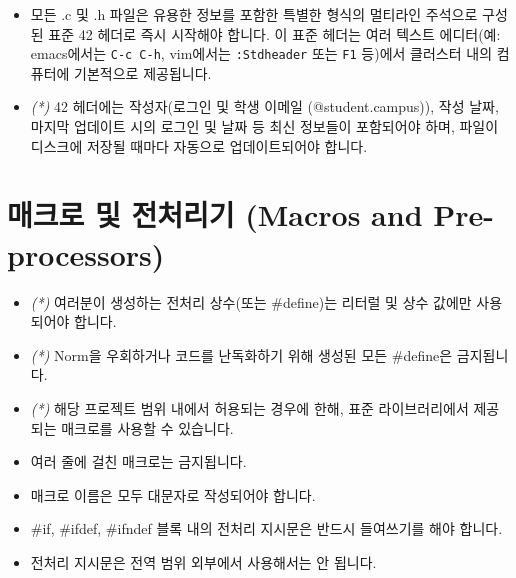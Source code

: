 \documentclass{42-ko}
\begin{document}
        \begin{itemize}

        \item 모든 .c 및 .h 파일은 유용한 정보를 포함한 특별한 형식의 멀티라인
          주석으로 구성된 표준 42 헤더로 즉시 시작해야 합니다. 이 표준 헤더는
          여러 텍스트 에디터(예: emacs에서는 \texttt{C-c C-h}, vim에서는 \texttt{:Stdheader}
          또는 \texttt{F1} 등)에서 클러스터 내의 컴퓨터에 기본적으로 제공됩니다.

        \item \textit{(*)} 42 헤더에는 작성자(로그인 및 학생 이메일 (@student.campus)),
          작성 날짜, 마지막 업데이트 시의 로그인 및 날짜 등 최신 정보들이
          포함되어야 하며, 파일이 디스크에 저장될 때마다 자동으로 업데이트되어야
          합니다.

        \end{itemize}

        \newpage


    \section{매크로 및 전처리기 (Macros and Pre-processors)}

        \begin{itemize}

            \item \textit{(*)} 여러분이 생성하는 전처리 상수(또는 \#define)는
              리터럴 및 상수 값에만 사용되어야 합니다.
            \item \textit{(*)} Norm을 우회하거나 코드를 난독화하기 위해 생성된
              모든 \#define은 금지됩니다.
            \item \textit{(*)} 해당 프로젝트 범위 내에서 허용되는 경우에 한해,
              표준 라이브러리에서 제공되는 매크로를 사용할 수 있습니다.
            \item 여러 줄에 걸친 매크로는 금지됩니다.
            \item 매크로 이름은 모두 대문자로 작성되어야 합니다.
            \item \#if, \#ifdef, \#ifndef 블록 내의 전처리 지시문은 반드시
              들여쓰기를 해야 합니다.
            \item 전처리 지시문은 전역 범위 외부에서 사용해서는 안 됩니다.

        \end{itemize}
        \newpage
\end{document}
